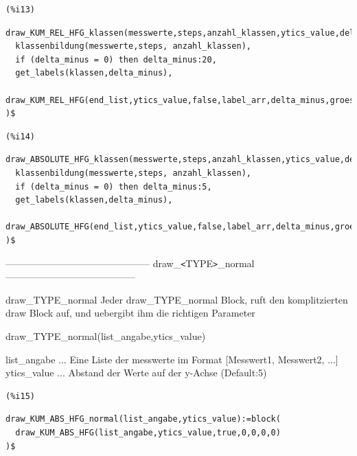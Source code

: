 \documentclass{article}
\begin{document}
\noindent
\begin{minipage}[t]{8ex}{\color{red}\bf
\begin{verbatim}
(%i13) 
\end{verbatim}}
\end{minipage}
\begin{minipage}[t]{\textwidth}{\color{blue}
\begin{verbatim}
draw_KUM_REL_HFG_klassen(messwerte,steps,anzahl_klassen,ytics_value,delta_minus,groesse1,groesse2):=block(
  klassenbildung(messwerte,steps, anzahl_klassen),
  if (delta_minus = 0) then delta_minus:20,
  get_labels(klassen,delta_minus),
  draw_KUM_REL_HFG(end_list,ytics_value,false,label_arr,delta_minus,groesse1,groesse2)
)$
\end{verbatim}}
\end{minipage}


\noindent
\begin{minipage}[t]{8ex}{\color{red}\bf
\begin{verbatim}
(%i14) 
\end{verbatim}}
\end{minipage}
\begin{minipage}[t]{\textwidth}{\color{blue}
\begin{verbatim}
draw_ABSOLUTE_HFG_klassen(messwerte,steps,anzahl_klassen,ytics_value,delta_minus,groesse1,groesse2):=block(
  klassenbildung(messwerte,steps, anzahl_klassen),
  if (delta_minus = 0) then delta_minus:5,
  get_labels(klassen,delta_minus),
  draw_ABSOLUTE_HFG(end_list,ytics_value,false,label_arr,delta_minus,groesse1,groesse2)
)$
\end{verbatim}}
\end{minipage}

--------------------------------------------- draw\_\verb|<|TYPE\verb|>|\_normal -----------------------------------------

draw\_TYPE\_normal
    Jeder draw\_TYPE\_normal Block, ruft den komplitzierten draw Block auf, und uebergibt ihm die richtigen Parameter


draw\_TYPE\_normal(list\_angabe,ytics\_value)

list\_angabe       ... Eine Liste der messwerte im Format [Messwert1, Messwert2, ...]
ytics\_value     ... Abstand der Werte auf der y-Achse (Default:5)

\noindent
\begin{minipage}[t]{8ex}{\color{red}\bf
\begin{verbatim}
(%i15) 
\end{verbatim}}
\end{minipage}
\begin{minipage}[t]{\textwidth}{\color{blue}
\begin{verbatim}
draw_KUM_ABS_HFG_normal(list_angabe,ytics_value):=block(
  draw_KUM_ABS_HFG(list_angabe,ytics_value,true,0,0,0,0)
)$
\end{verbatim}}
\end{minipage}
\end{document}
